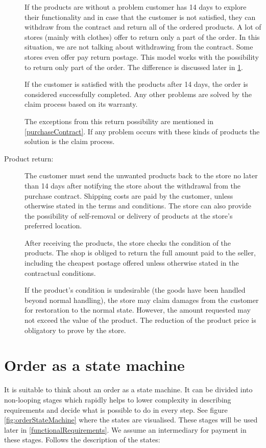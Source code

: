 \documentclass[thesis=M,english]{FITthesis}[2019/12/23]
\begin{document}
\begin{description}
If the products are without a problem customer has 14 days to explore their functionality and in case that the customer is not satisfied, they can withdraw from the contract and return all of the ordered products. A lot of stores (mainly with clothes) offer to return only a part of the order. In this situation, we are not talking about withdrawing from the contract. Some stores even offer pay return postage. This model works with the possibility to return only part of the order. The difference is discussed later in \ref{orderAsStateMachine}.

If the customer is satisfied with the products after 14 days, the order is considered successfully completed. Any other problems are solved by the claim process based on its warranty.

The exceptions from this return possibility are mentioned in \ref{purchaseContract}. If any problem occurs with these kinds of products the solution is the claim process. 

\item[Product return:]
The customer must send the unwanted products back to the store no later than 14 days after notifying the store about the withdrawal from the purchase contract. Shipping costs are paid by the customer, unless otherwise stated in the terms and conditions.
The store can also provide the possibility of self-removal or delivery of products at the store's preferred location.

After receiving the products, the store checks the condition of the products. The shop is obliged to return the full amount paid to the seller, including the cheapest postage offered unless otherwise stated in the contractual conditions.

If the product's condition is undesirable (the goods have been handled beyond normal handling), the store may claim damages from the customer for restoration to the normal state. However, the amount requested may not exceed the value of the product.\cite{customerProtection} The reduction of the product price is obligatory to prove by the store.

\end{description}


\section{Order as a state machine} \label{orderAsStateMachine}

It is suitable to think about an order as a state machine. It can be divided into non-looping stages which rapidly helps to lower complexity in describing requirements and decide what is possible to do in every step. See figure \ref{fig:orderStateMachine} where the states are visualised. These stages will be used later in \ref{functionalRequirements}. We assume an intermediary for payment in these stages. Follows the description of the states:
\end{document}
